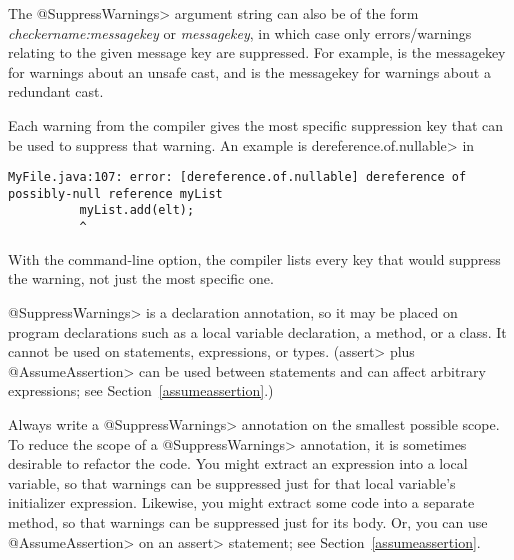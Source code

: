 The \<@SuppressWarnings> argument string can also  be of the form
\emph{checkername:messagekey} or \emph{messagekey}, in which case only
errors/warnings relating to the given message key are suppressed.  For example,
 is the messagekey for warnings about an unsafe cast, and
 is the messagekey for warnings about a redundant cast.

Each warning from the compiler gives the most specific
suppression key that can be used to suppress that warning.
An example is \<dereference.of.nullable> in

\begin{smaller}
\begin{Verbatim}
MyFile.java:107: error: [dereference.of.nullable] dereference of possibly-null reference myList
          myList.add(elt);
          ^
\end{Verbatim}
\end{smaller}

\noindent
With the  command-line option,
the compiler lists every key that would suppress the warning,
not just the most specific one.

%



\<@SuppressWarnings> is a declaration annotation, so it may be placed on
program declarations such as a local variable declaration, a method, or a
class.  It cannot be used on statements, expressions, or types.
(\<assert> plus \<@AssumeAssertion> can be used between statements and can
affect arbitrary expressions; see Section~\ref{assumeassertion}.)

Always write a \<@SuppressWarnings> annotation on the smallest possible
scope.  To reduce the scope of a \<@SuppressWarnings> annotation, it is
sometimes desirable to refactor the code.  You might extract an expression
into a local variable, so that warnings can be suppressed just for that
local variable's initializer expression.  Likewise, you might extract some
code into a separate method, so that warnings can be suppressed just for
its body.  Or, you can use \<@AssumeAssertion> on an \<assert> statement;
see Section~\ref{assumeassertion}.

